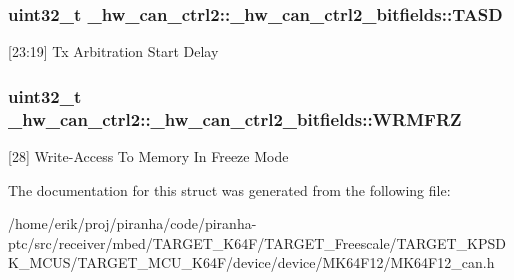\subsubsection[{\texorpdfstring{T\+A\+SD}{TASD}}]{\setlength{\rightskip}{0pt plus 5cm}uint32\+\_\+t \+\_\+hw\+\_\+can\+\_\+ctrl2\+::\+\_\+hw\+\_\+can\+\_\+ctrl2\+\_\+bitfields\+::\+T\+A\+SD}\hypertarget{struct__hw__can__ctrl2_1_1__hw__can__ctrl2__bitfields_a6f1fcd1cf1a9c9b6d2e520b642e832b3}{}\label{struct__hw__can__ctrl2_1_1__hw__can__ctrl2__bitfields_a6f1fcd1cf1a9c9b6d2e520b642e832b3}
\mbox{[}23\+:19\mbox{]} Tx Arbitration Start Delay 
\subsubsection[{\texorpdfstring{W\+R\+M\+F\+RZ}{WRMFRZ}}]{\setlength{\rightskip}{0pt plus 5cm}uint32\+\_\+t \+\_\+hw\+\_\+can\+\_\+ctrl2\+::\+\_\+hw\+\_\+can\+\_\+ctrl2\+\_\+bitfields\+::\+W\+R\+M\+F\+RZ}\hypertarget{struct__hw__can__ctrl2_1_1__hw__can__ctrl2__bitfields_af07bdaf9c52dad5f9d1401e046cf6adb}{}\label{struct__hw__can__ctrl2_1_1__hw__can__ctrl2__bitfields_af07bdaf9c52dad5f9d1401e046cf6adb}
\mbox{[}28\mbox{]} Write-\/\+Access To Memory In Freeze Mode 

The documentation for this struct was generated from the following file\+:\begin{DoxyCompactItemize}
\item 
/home/erik/proj/piranha/code/piranha-\/ptc/src/receiver/mbed/\+T\+A\+R\+G\+E\+T\+\_\+\+K64\+F/\+T\+A\+R\+G\+E\+T\+\_\+\+Freescale/\+T\+A\+R\+G\+E\+T\+\_\+\+K\+P\+S\+D\+K\+\_\+\+M\+C\+U\+S/\+T\+A\+R\+G\+E\+T\+\_\+\+M\+C\+U\+\_\+\+K64\+F/device/device/\+M\+K64\+F12/M\+K64\+F12\+\_\+can.\+h\end{DoxyCompactItemize}
